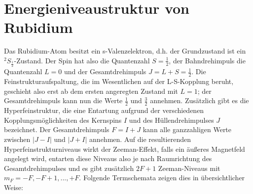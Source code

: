 \documentclass[bigchapter,colorback,accentcolor=tud4b,linedtoc,11pt]{tudreport}
\begin{document}
\section{Energieniveaustruktur von Rubidium}

Das Rubidium-Atom besitzt ein s-Valenzelektron, d.h. der Grundzustand ist ein $^2S_{\frac{1}{2}}$-Zustand. Der Spin hat also die Quantenzahl $S = \frac{1}{2}$, der Bahndrehimpuls die Quantenzahl $L = 0$ und der Gesamtdrehimpuls $J = L + S = \frac{1}{2}$. Die Feinstrukturaufspaltung, die im Wesentlichen auf der L-S-Kopplung beruht, geschieht also erst ab dem ersten angeregten Zustand mit $L = 1$; der Gesamtdrehimpuls kann nun die Werte $\frac{1}{2}$ und $\frac{3}{2}$ annehmen. Zusätzlich gibt es die Hyperfeinstruktur, die eine Entartung aufgrund der verschiedenen Kopplungsmöglichkeiten des Kernspins $I$ und des Hüllendrehimpulses $J$ bezeichnet. Der Gesamtdrehimpuls $F = I + J$ kann alle ganzzahligen Werte zwischen $|J-I|$ und $|J+I|$ annehmen. Auf die resultierenden Hyperfeinstrukturniveaus wirkt der Zeeman-Effekt, falls ein äußeres Magnetfeld angelegt wird, entarten diese Niveaus also je nach Raumrichtung des Gesamtdrehimpulses und es gibt zusätzlich $2F+1$ Zeeman-Niveaus mit $m_F = -F, -F+1, ..., +F$. Folgende Termschemata zeigen dies in übersichtlicher Weise:
\end{document}

